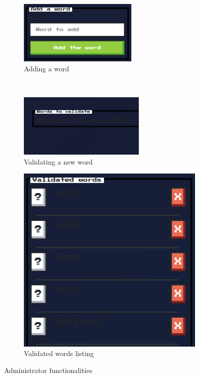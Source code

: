 \documentclass{tnreport}
\begin{document}
\begin{figure}[ht]
	\centering
	\begin{subfigure}[t]{0.5\textwidth}
		\centering
		\includegraphics[height=1.2in]{figures/admin_add_word}
		\caption{Adding a word}
		\label{fig:admin_add_word}
	\end{subfigure}%
	~ 
	\begin{subfigure}[t]{0.5\textwidth}
		\centering
		\includegraphics[height=1.2in]{figures/admin_validate_word}
		\caption{Validating a new word}
		\label{fig:admin_validate_word}
	\end{subfigure}
	\begin{subfigure}[t]{0.5\textwidth}
		\centering
		\vspace*{1cm}
		\includegraphics[scale=0.6]{figures/admin_validated_words}
		\caption{Validated words listing}
		\label{fig:admin_validated_words}
	\end{subfigure}
	\caption{Administrator functionalities}
\end{figure} 
\end{document}
